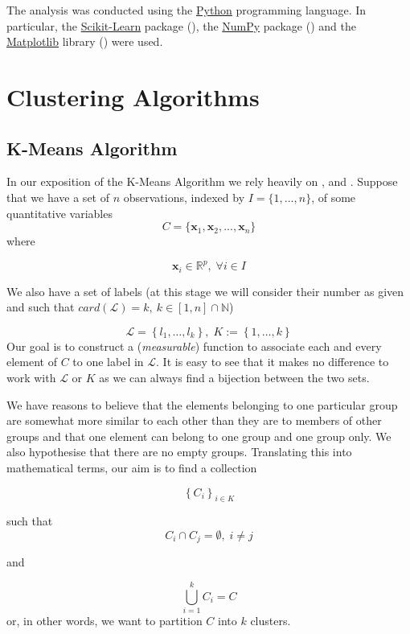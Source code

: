 \documentclass[a4paper]{article}
\begin{document}
	The analysis was conducted using the \href{https://www.python.org/}{Python} programming language. In particular, the \href{http://scikit-learn.org/stable/}{Scikit-Learn} package (\cite{scikit-learn}), the \href{http://www.numpy.org/}{NumPy} package (\cite{doi:10.1109/MCSE.2011.37}) and the \href{https://matplotlib.org/}{Matplotlib} library (\cite{Hunter_2007}) were used.
	\section{Clustering Algorithms}
	\subsection{K-Means Algorithm}
	In our exposition of the K-Means Algorithm we rely heavily on \cite{hastie01statisticallearning}, \cite{MR2372475} and \cite{zaki2014dataminingbook}.
	Suppose that we have a set of $n$ observations, indexed by $I = \{1, ..., n\}$, of some quantitative
	variables
	$$ C = \{ \boldsymbol{x}_{1}, \boldsymbol{x}_{2}, ..., \boldsymbol{x}_{n} \} $$
	where

	$$ \boldsymbol{x}_{i} \in \mathbb{R}^{p},\;\forall i\in I$$


	We also have a set of labels (at this stage we will consider their
	number as given and such that $card(\mathcal{L})=k,\:k\in\left[1,n\right]\cap\mathbb{N}$)

	$$
	\mathcal{L}=\left\{ l_{1},\ldots,l_{k}\right\} ,\;K:=\left\{ 1,\ldots,k\right\}
	$$
	Our goal is to construct a (\textit{measurable}) function to associate each
	and every element of $C$ to one label in $\mathcal{L}$. It is easy
	to see that it makes no difference to work with $\mathcal{L}$ or
	$K$ as we can always find a bijection between the two sets.

	We have reasons to believe that the elements belonging to one particular
	group are somewhat more similar to each other than they are to members
	of other groups and that one element can belong to one group and one
	group only. We also hypothesise that there are no empty groups. Translating
	this into mathematical terms, our aim is to find a collection

	$$ 	\left\{ C_{i}\right\} _{i\in K}	$$

	such that
	$$ C_{i}\cap C_{j}=\emptyset,\;i\neq j $$

	and

	$$
	\bigcup_{i=1}^{k} C_{i} = C
	$$
	or, in other words, we want to partition $C$ into $k$ clusters.
\end{document}
